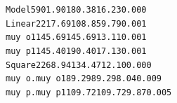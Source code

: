 \documentclass[12pt,a4paper]{article}
\newcommand{\code}[1]{\texttt{#1}}
\begin{document}
\code{Model}\hspace*{3.5cm}\code{5}\hspace*{1cm}\code{901.90}\hspace*{1cm}\code{180.38}\hspace*{1.5cm}\code{16.23}\hspace*{1.4cm}\code{0.000}\\
\hspace*{0.5cm}\code{Linear}\hspace*{2.75cm}\code{2}\hspace*{1cm}\code{217.69}\hspace*{1cm}\code{108.85}\hspace*{1.75cm}\code{9.79}\hspace*{1.4cm}\code{0.001}\\
\hspace*{1cm}\code{muy o}\hspace*{2.5cm}\code{1}\hspace*{1cm}\code{145.69}\hspace*{1cm}\code{145.69}\hspace*{1.5cm}\code{13.11}\hspace*{1.4cm}\code{0.001}\\
\hspace*{1cm}\code{muy p}\hspace*{2.5cm}\code{1}\hspace*{1cm}\code{145.40}\hspace*{1cm}\code{190.40}\hspace*{1.5cm}\code{17.13}\hspace*{1.4cm}\code{0.001}\\
\hspace*{0.5cm}\code{Square}\hspace*{2.75cm}\code{2}\hspace*{1cm}\code{268.94}\hspace*{1cm}\code{134.47}\hspace*{1.5cm}\code{12.10}\hspace*{1.4cm}\code{0.000}\\
\hspace*{1cm}\code{muy o.muy o}\hspace*{1cm}\code{1}\hspace*{1.25cm}\code{89.29}\hspace*{1.25cm}\code{89.29}\hspace*{1.75cm}\code{8.04}\hspace*{1.4cm}\code{0.009}\\
\hspace*{1cm}\code{muy p.muy p}\hspace*{1cm}\code{1}\hspace*{1cm}\code{109.72}\hspace*{1cm}\code{109.72}\hspace*{1.75cm}\code{9.87}\hspace*{1.4cm}\code{0.005}\\
\end{document}
